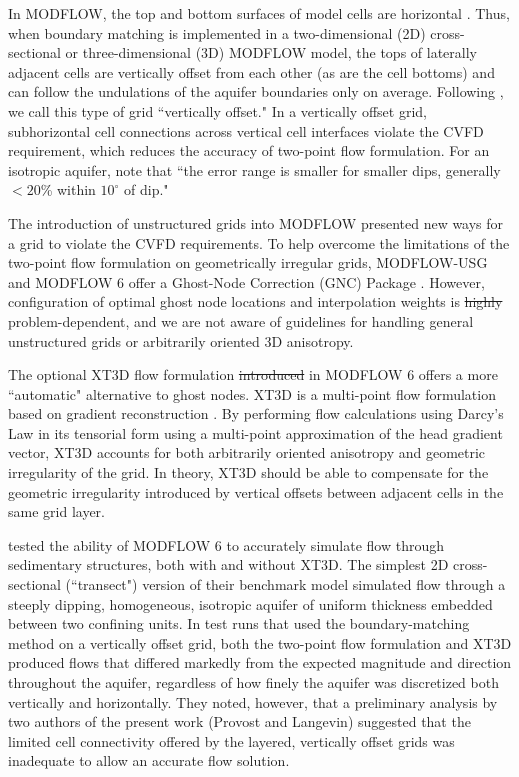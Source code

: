 \documentclass{article}
\begin{document}
In MODFLOW, the top and bottom surfaces of model cells are horizontal \citep{modflow6gwf}. Thus, when boundary matching is implemented in a two-dimensional (2D) cross-sectional or three-dimensional (3D) MODFLOW model, the tops of laterally adjacent cells are vertically offset from each other (as are the cell bottoms) and can follow the undulations of the aquifer boundaries only on average. Following \cite{bardot2023}, we call this type of grid ``vertically offset." In a vertically offset grid, subhorizontal cell connections across vertical cell interfaces violate the CVFD requirement, which reduces the accuracy of two-point flow formulation. For an isotropic aquifer, \cite{hoaglund2003} note that ``the error range is smaller for smaller dips, generally $<20$\% within $10^{\circ}$ of dip."

The introduction of unstructured grids into MODFLOW \citep{modflowusg, modflow6gwf} presented new ways for a grid to violate the CVFD requirements. To help overcome the limitations of the two-point flow formulation on geometrically irregular grids, MODFLOW-USG and MODFLOW 6 offer a Ghost-Node Correction (GNC) Package \citep{modflowusg, modflow6gwf}. However, configuration of optimal ghost node locations and interpolation weights is {\color{red} \sout{highly }}problem-dependent, and we are not aware of guidelines for handling general unstructured grids or arbitrarily oriented 3D anisotropy.

The optional XT3D flow formulation \citep{modflow6xt3d} {\color{red} \sout{introduced }}in MODFLOW 6 offers a more ``automatic" alternative to ghost nodes. XT3D is a multi-point flow formulation \citep{edwards1998, aavatsmark2002} based on gradient reconstruction \citep{mavriplis2003leastsq, diskin2008accuracy}. By performing flow calculations using Darcy's Law in its tensorial form using a multi-point approximation of the head gradient vector, XT3D accounts for both arbitrarily oriented anisotropy and geometric irregularity of the grid. In theory, XT3D should be able to compensate for the geometric irregularity introduced by vertical offsets between adjacent cells in the same grid layer.

\cite{bardot2023} tested the ability of MODFLOW 6 to accurately simulate flow through sedimentary structures, both with and without XT3D. The simplest 2D cross-sectional (``transect") version of their benchmark model simulated flow through a steeply dipping, homogeneous, isotropic aquifer of uniform thickness embedded between two confining units. In test runs that used the boundary-matching method on a vertically offset grid, both the two-point flow formulation and XT3D produced flows that differed markedly from the expected magnitude and direction throughout the aquifer, regardless of how finely the aquifer was discretized {\color{red} both vertically and horizontally}. They noted, however, that a preliminary analysis by two authors of the present work (Provost and Langevin) suggested that the limited cell connectivity offered by the layered, vertically offset grids was inadequate to allow an accurate flow solution.
\end{document}
